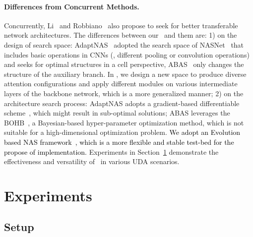 \documentclass[10pt,twocolumn,letterpaper]{article}
\begin{document}
\vspace{-3mm}
\paragraph{Differences from Concurrent Methods.}
Concurrently, Li\etal~\cite{li2020adapting} and Robbiano\etal~\cite{robbiano2021adversarial} also propose to seek for better transferable network architectures.
The differences between our \iMethod\, and them are:
1) on the design of search space: AdaptNAS~\cite{li2020adapting} adopted the search space of NASNet~\cite{zoph2018NASNet} that includes basic operations in CNNs (\eg, different pooling or convolution operations) and seeks for optimal structures in a cell perspective, ABAS~\cite{robbiano2021adversarial} only changes the structure of the auxiliary branch. In \iMethod, we design a new space to produce diverse attention configurations and apply different modules on various intermediate layers of the backbone network, which is a more generalized manner;
2) on the architecture search process: AdaptNAS adopts a gradient-based differentiable scheme~\cite{liu2018DARTS}, which might result in sub-optimal solutions; ABAS leverages the BOHB~\cite{falkner2018bohb}, a Bayesian-based hyper-parameter optimization method, which is not suitable for a high-dimensional optimization problem. \textcolor{black}{We adopt an Evolution based NAS framework~\cite{back1996evolutionary}, which is a more flexible and stable test-bed for the propose of implementation.}
Experiments in Section~\ref{sec:exp} demonstrate the effectiveness and versatility of \iMethod\, in various UDA scenarios.

%
 
\section{Experiments}
\label{sec:exp}
\subsection{Setup}
\end{document}
